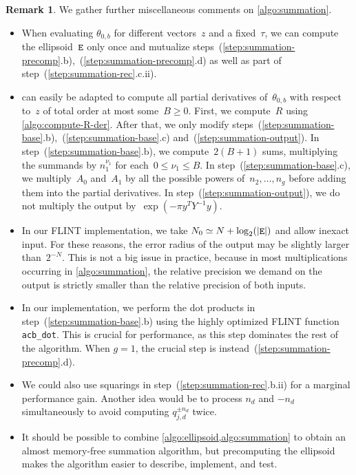 \documentclass[12pt,oneside]{amsart}
\numberwithin{equation}{section}
\theoremstyle{definition}
\newtheorem{rem}[equation]{Remark}
\DeclareMathOperator{\E}{\tt E}
\DeclarePairedDelimiter{\abs}{|}{|}
\begin{document}
\begin{rem} We gather further miscellaneous comments on \cref{algo:summation}.
  \begin{itemize}
  \item When evaluating $\theta_{0,b}$ for different vectors~$z$ and a
    fixed~$\tau$, we can compute the ellipsoid~$\E$ only once and mutualize
    steps~(\ref{step:summation-precomp}.b),~(\ref{step:summation-precomp}.d) as
    well as part of step~(\ref{step:summation-rec}.c.ii).
  \item {} can easily be adapted to compute all partial
    derivatives of~$\theta_{0,b}$ with respect to~$z$ of total order at most
    some~$B\geq 0$. First, we compute~$R$ using
    \cref{algo:compute-R-der}. After that, we only modify
    steps~(\ref{step:summation-base}.b),~(\ref{step:summation-base}.c)
    and~(\ref{step:summation-output}). In step~(\ref{step:summation-base}.b),
    we compute~$2(B+1)$ sums, multiplying the summands by $n_1^{\nu_1}$ for
    each~$0\leq \nu_1\leq B$. In step~(\ref{step:summation-base}.c), we
    multiply~$A_0$ and~$A_1$ by all the possible powers of~$n_2,\ldots,n_g$
    before adding them into the partial derivatives. In
    step~(\ref{step:summation-output}), we do not multiply the output
    by~$\exp(-\pi y^T Y^{-1}y)$.
  \item In our FLINT implementation, we take $N_0\simeq N + \log_2(\abs{\E})$
    and allow inexact input. For these reasons, the error radius of the output
    may be slightly larger than~$2^{-N}$. This is not a big issue in practice,
    because in most multiplications occurring in \cref{algo:summation}, the
    relative precision we demand on the output is strictly smaller than the
    relative precision of both inputs.
  \item In our implementation, we perform the dot products in
    step~(\ref{step:summation-base}.b) using the highly optimized FLINT
    function \texttt{acb\_dot}. This is crucial for performance, as this step
    dominates the rest of the algorithm. When $g=1$, the crucial step is
    instead~(\ref{step:summation-precomp}.d).
  \item We could also use squarings in step~(\ref{step:summation-rec}.b.ii) for a
    marginal performance gain. Another idea would be to process $n_d$
    and $-n_d$ simultaneously to avoid computing ${q_{j,d}^{\pm n_d}}$ twice.
  \item It should be possible to combine \cref{algo:ellipsoid,algo:summation}
    to obtain an almost memory-free summation algorithm, but precomputing the
    ellipsoid makes the algorithm easier to describe, implement, and test.
  \end{itemize}
\end{rem}
\end{document}
